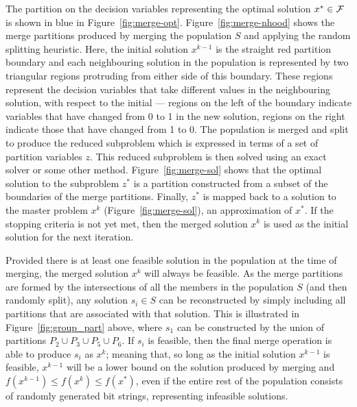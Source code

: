 \documentclass[journal]{IEEEtran}
\begin{document}
The partition on the decision variables representing the optimal solution $x^* \in {\cal F}$ is shown in blue in Figure~\ref{fig:merge-opt}. Figure~\ref{fig:merge-nhood} shows the merge partitions produced by merging the population $S$ and applying the random splitting heuristic. Here, the initial solution $x^{k-1}$ is the straight red partition boundary and each neighbouring solution in the population is represented by two triangular regions protruding from either side of this boundary. These regions represent the decision variables that take different values in the neighbouring solution, with respect to the initial --- regions on the left of the boundary indicate variables that have changed from 0 to 1 in the new solution, regions on the right indicate those that have changed from 1 to 0. The population is merged and split to produce the reduced subproblem which is expressed in terms of a set of partition variables $z$. This reduced subproblem is then solved using an exact solver or some other method. Figure~\ref{fig:merge-sol} shows that the optimal solution to the subproblem $z^*$ is a partition constructed from a subset of the boundaries of the merge partitions. Finally, $z^*$ is mapped back to a solution to the master problem $x^k$ (Figure~\ref{fig:merge-sol}), an approximation of $x^*$. If the stopping criteria is not yet met, then the merged solution $x^k$ is used as the initial solution for the next iteration.

Provided there is at least one feasible solution in the population at the time of merging, the merged solution $x^k$ will always be feasible. As the merge partitions are formed by the intersections of all the members in the population $S$ (and then randomly split), any solution $s_i \in S$ can be reconstructed by simply including all partitions that are associated with that solution. This is illustrated in Figure~\ref{fig:group_part} above, where $s_1$ can be constructed by the union of partitions $P_2 \cup P_3 \cup P_5 \cup P_6$. If $s_i$ is feasible, then the final merge operation is able to produce $s_i$ as $x^k$; meaning that, so long as the initial solution $x^{k-1}$ is feasible, $x^{k-1}$ will be a lower bound on the solution produced by merging and $f(x^{k-1}) \leq f(x^k) \leq f(x^*)$, even if the entire rest of the population consists of randomly generated bit strings, representing infeasible solutions.
\end{document}
